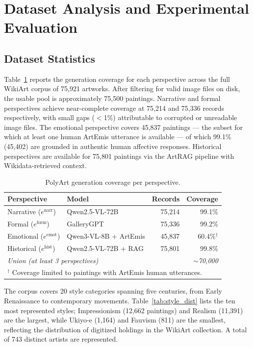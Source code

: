 \section{Dataset Analysis and Experimental Evaluation}

\subsection{Dataset Statistics}

Table~\ref{tab:generation_stats} reports the generation coverage for each perspective across the full WikiArt corpus of 75,921 artworks.
After filtering for valid image files on disk, the usable pool is approximately 75,500 paintings.
Narrative and formal perspectives achieve near-complete coverage at 75,214 and 75,336 records respectively, with small gaps ($<$1\%) attributable to corrupted or unreadable image files.
The emotional perspective covers 45,837 paintings --- the subset for which at least one human ArtEmis utterance is available --- of which 99.1\% (45,402) are grounded in authentic human affective responses.
Historical perspectives are available for 75,801 paintings via the ArtRAG pipeline with Wikidata-retrieved context.

\begin{table}[h]
\centering
\caption{PolyArt generation coverage per perspective.}
\label{tab:generation_stats}
\begin{tabular}{llrr}
\toprule
\textbf{Perspective} & \textbf{Model} & \textbf{Records} & \textbf{Coverage} \\
\midrule
Narrative ($e^{\text{narr}}$)   & Qwen2.5-VL-72B      & 75,214 & 99.1\% \\
Formal ($e^{\text{form}}$)      & GalleryGPT           & 75,336 & 99.2\% \\
Emotional ($e^{\text{emot}}$)   & Qwen3-VL-8B + ArtEmis & 45,837 & 60.4\%$^\dagger$ \\
Historical ($e^{\text{hist}}$)  & Qwen2.5-VL-72B + RAG & 75,801 & 99.8\% \\
\midrule
\multicolumn{2}{l}{\textit{Union (at least 3 perspectives)}} & \multicolumn{2}{r}{\textit{$\sim$70,000}} \\
\bottomrule
\multicolumn{4}{l}{\small $^\dagger$ Coverage limited to paintings with ArtEmis human utterances.} \\
\end{tabular}
\end{table}

The corpus covers 20 style categories spanning five centuries, from Early Renaissance to contemporary movements.
Table~\ref{tab:style_dist} lists the ten most represented styles; Impressionism (12,662 paintings) and Realism (11,391) are the largest, while Ukiyo-e (1,164) and Fauvism (811) are the smallest, reflecting the distribution of digitized holdings in the WikiArt collection.
A total of 743 distinct artists are represented.

